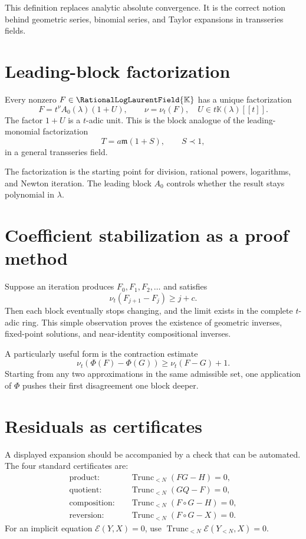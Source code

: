 \documentclass[11pt,openany]{book}
\theoremstyle{definition}
\theoremstyle{plain}
\theoremstyle{remark}
\newcommand{\K}{\mathbb{K}}
\newcommand{\Rlog}{\RationalLogLaurentField{\K}}
\newcommand{\m}{\mathfrak{m}}
\newcommand{\precdom}{\prec}
\newcommand{\val}{\nu}
\DeclareMathOperator{\trunc}{Trunc}
\begin{document}
This definition replaces analytic absolute convergence. It is the correct notion behind geometric series, binomial series, and Taylor expansions in transseries fields.

\section{Leading-block factorization}
Every nonzero \(F\in\Rlog\) has a unique factorization
\begin{equation}\label{eq:leading-block-factor}
 F=t^\nu A_0(\lambda)(1+U),
 \qquad \nu=\val_t(F),\quad U\in t\K(\lambda)[[t]].
\end{equation}
The factor \(1+U\) is a \(t\)-adic unit. This is the block analogue of the leading-monomial factorization
\[
 T=a\m(1+S),\qquad S\precdom1,
\]
in a general transseries field.

The factorization is the starting point for division, rational powers, logarithms, and Newton iteration. The leading block \(A_0\) controls whether the result stays polynomial in \(\lambda\).

\section{Coefficient stabilization as a proof method}
Suppose an iteration produces \(F_0,F_1,F_2,\ldots\) and satisfies
\begin{equation}\label{eq:gain-one}
 \val_t(F_{j+1}-F_j)\ge j+c.
\end{equation}
Then each block eventually stops changing, and the limit exists in the complete \(t\)-adic ring. This simple observation proves the existence of geometric inverses, fixed-point solutions, and near-identity compositional inverses.

A particularly useful form is the contraction estimate
\begin{equation}\label{eq:valuation-contraction}
 \val_t(\Phi(F)-\Phi(G))\ge \val_t(F-G)+1.
\end{equation}
Starting from any two approximations in the same admissible set, one application of \(\Phi\) pushes their first disagreement one block deeper.

\section{Residuals as certificates}
A displayed expansion should be accompanied by a check that can be automated. The four standard certificates are:
\begin{align*}
\text{product:}&\quad \trunc_{<N}(FG-H)=0,\\
\text{quotient:}&\quad \trunc_{<N}(GQ-F)=0,\\
\text{composition:}&\quad \trunc_{<N}(F\circ G-H)=0,\\
\text{reversion:}&\quad \trunc_{<N}(F\circ G-X)=0.
\end{align*}
For an implicit equation \(\mathcal E(Y,X)=0\), use \(\trunc_{<N}\mathcal E(Y_{<N},X)=0\).
\end{document}
